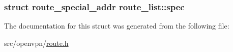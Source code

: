 \subsubsection[{spec}]{\setlength{\rightskip}{0pt plus 5cm}struct {\bf route\+\_\+special\+\_\+addr} route\+\_\+list\+::spec}\label{structroute__list_a8b0265a1e6b98143c03ff728b232a454}


The documentation for this struct was generated from the following file\+:\begin{DoxyCompactItemize}
\item 
src/openvpn/\hyperlink{route_8h}{route.\+h}\end{DoxyCompactItemize}
